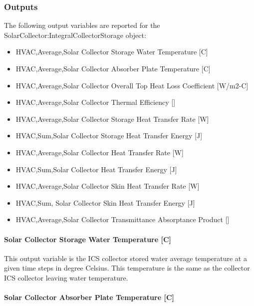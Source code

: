 \subsubsection{Outputs}\label{outputs-2-020}

The following output variables are reported for the SolarCollector:IntegralCollectorStorage object:

\begin{itemize}
\item
  HVAC,Average,Solar Collector Storage Water Temperature {[}C{]}
\item
  HVAC,Average,Solar Collector Absorber Plate Temperature {[}C{]}
\item
  HVAC,Average,Solar Collector Overall Top Heat Loss Coefficient {[}W/m2-C{]}
\item
  HVAC,Average,Solar Collector Thermal Efficiency {[]}
\item
  HVAC,Average,Solar Collector Storage Heat Transfer Rate {[}W{]}
\item
  HVAC,Sum,Solar Collector Storage Heat Transfer Energy {[}J{]}
\item
  HVAC,Average,Solar Collector Heat Transfer Rate {[}W{]}
\item
  HVAC,Sum,Solar Collector Heat Transfer Energy {[}J{]}
\item
  HVAC,Average,Solar Collector Skin Heat Transfer Rate {[}W{]}
\item
  HVAC,Sum, Solar Collector Skin Heat Transfer Energy {[}J{]}
\item
  HVAC,Average,Solar Collector Transmittance Absorptance Product {[]}
\end{itemize}

\paragraph{Solar Collector Storage Water Temperature {[}C{]}}\label{solar-collector-storage-water-temperature-c}

This output variable is the ICS collector stored water average temperature at a given time steps in degree Celsius. This temperature is the same as the collector ICS collector leaving water temperature.

\paragraph{Solar Collector Absorber Plate Temperature {[}C{]}}\label{solar-collector-absorber-plate-temperature-c}

